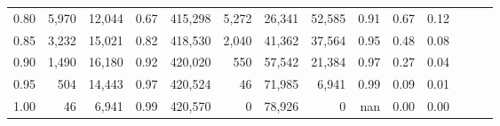 \begin{tabular}{rrrrrrrrrrrrrr}
0.80 &   5,970 &  12,044 &  0.67 &  415,298 &    5,272 &  26,341 &  52,585 &  0.91 &  0.67 &      0.12 \\
0.85 &   3,232 &  15,021 &  0.82 &  418,530 &    2,040 &  41,362 &  37,564 &  0.95 &  0.48 &      0.08 \\
0.90 &   1,490 &  16,180 &  0.92 &  420,020 &      550 &  57,542 &  21,384 &  0.97 &  0.27 &      0.04 \\
0.95 &     504 &  14,443 &  0.97 &  420,524 &       46 &  71,985 &   6,941 &  0.99 &  0.09 &      0.01 \\
1.00 &      46 &   6,941 &  0.99 &  420,570 &        0 &  78,926 &       0 &   nan &  0.00 &      0.00 \\
\bottomrule
\end{tabular}
